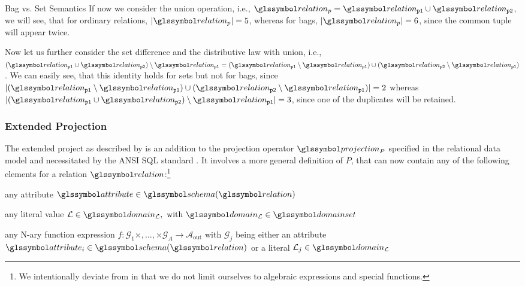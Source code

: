 \begin{example}[label=example:bag_vs_set]{Bag vs. Set Semantics}{}
    If now we consider the union operation, i.e., $\relation_{p} = \relation_{\mathtt{p1}} \cup \relation_{\mathtt{p2}}$, we will see, that for ordinary relations, $|\relation_{p}| = 5$, whereas for bags, $|\relation_{p}| = 6$, since the common tuple will appear twice.

    Now let us further consider the set difference and the distributive law with union, i.e., $(\relation_{\mathtt{p1}} \cup \relation_{\mathtt{p2}}) \setminus \relation_{\mathtt{p1}} = (\relation_{\mathtt{p1}} \setminus \relation_{\mathtt{p1}}) \cup (\relation_{\mathtt{p2}} \setminus \relation_{\mathtt{p1}})$. We can easily see, that this identity holds for sets but not for bags, since $|(\relation_{\mathtt{p1}} \setminus \relation_{\mathtt{p1}}) \cup (\relation_{\mathtt{p2}} \setminus \relation_{\mathtt{p1}})| = 2$ whereas $|(\relation_{\mathtt{p1}} \cup \relation_{\mathtt{p2}}) \setminus \relation_{\mathtt{p1}}| = 3$, since one of the duplicates will be retained.
\end{example}

\subsubsection{Extended Projection}

The extended project as described by \cite{Garcia:2009Database} is an addition to the projection operator $\projection_{P}$ specified in the relational data model and necessitated by the ANSI SQL standard \cite[]{XOpen:1996SQL}. It involves a more general definition of $P$, that can now contain any of the following elements for a relation $\relation$:\footnote{We intentionally deviate from \cite{Garcia:2009Database} in that we do not limit ourselves to algebraic expressions and special functions.}
\begin{enumerate*}[label=(\roman*),itemjoin={{, }}, itemjoin*={{, or, }}, after={{.}}]
    \item any attribute $\attribute \in \schema(\relation)$
    \item any literal value $\mathcal{L} \in \domain_{\mathcal{L}}, \text{ with } \domain_{\mathcal{L}} \in \domainset$
    \item any N-ary function expression $f \colon \mathcal{G}_1 \times, \ldots, \times \mathcal{G}_A \rightarrow \mathcal{A}_{\text{out}}$ with $\mathcal{G}_j$ being either an attribute $\attribute_i \in \schema(\relation)$ or a literal $\mathcal{L}_j \in \domain_{\mathcal{L}}$
\end{enumerate*}

